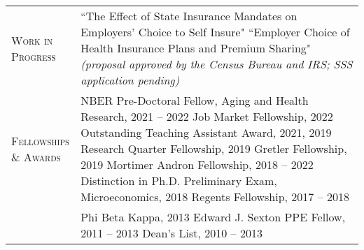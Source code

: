 \documentclass[11pt]{article}
\begin{document}
\begin{tabularx}{\textwidth}{@{}Y Z@{}}
    \textsc{Work in \newline Progress} \vspace{20pt} & 
    ``The Effect of State Insurance Mandates on Employers' Choice to Self Insure"
     \vspace{15pt} \newline
    ``Employer Choice of Health Insurance Plans and Premium Sharing" \newline
    \textit{(proposal approved by the Census Bureau and IRS; SSS application pending)} 
    \\[20pt]

	\textsc{Fellowships \newline \& Awards} \vspace{20pt} & 
	\underline{}
	\vspace{3pt} \newline
	NBER Pre-Doctoral Fellow, Aging and Health Research, 2021 -- 2022
	\vspace{15pt} \newline
	\underline{}
	\vspace{3pt} \newline
	Job Market Fellowship, 2022
	\vspace{3pt} \newline
	Outstanding Teaching Assistant Award, 2021, 2019
	\vspace{3pt} \newline
	Research Quarter Fellowship, 2019
	\vspace{3pt} \newline
	Gretler Fellowship, 2019
	\vspace{3pt} \newline
	Mortimer Andron Fellowship, 2018 -- 2022
	\vspace{3pt} \newline 
	Distinction in Ph.D. Preliminary Exam, Microeconomics, 2018
	\vspace{3pt} \newline
	Regents Fellowship, 2017 -- 2018
	\\ \newpage &
	\underline{}
	\vspace{3pt} \newline
	Phi Beta Kappa, 2013
	\vspace{3pt} \newline
	Edward J. Sexton PPE Fellow, 2011 -- 2013
	\vspace{3pt} \newline
	Dean's List, 2010 -- 2013
	\\[20pt]
	


\end{tabularx}
\end{document}
